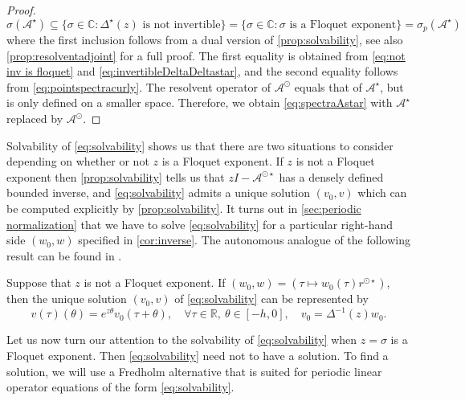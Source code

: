 \documentclass[english]{myarticle}
\begin{document}
\begin{sloppypar}
\begin{proof}
\begin{equation}
    \sigma(\mathcal{A}^{\star}) \subseteq \{ \sigma \in \mathbb{C} : \Delta^\star(z) \mbox{ is not invertible} \} = \{\sigma \in \mathbb{C} : \sigma \mbox{ is a Floquet exponent} \} = \sigma_p(\mathcal{A}^{\star})
\end{equation}
where the first inclusion follows from a dual version of \cref{prop:solvability}, see also \cref{prop:resolventadjoint} for a full proof. The first equality is obtained from \eqref{eq:not inv is floquet} and \eqref{eq:invertibleDeltaDeltastar}, and the second equality follows from \eqref{eq:pointspectracurly}. The resolvent operator of $\mathcal{A}^\odot$ equals that of $\mathcal{A}^\star$, but is only defined on a smaller space. Therefore, we obtain \eqref{eq:spectraAstar} with $\mathcal{A}^\star$ replaced by $\mathcal{A}^\odot$.
\end{proof}

Solvability of \eqref{eq:solvability} shows us that there are two situations to consider depending on whether or not $z$ is a Floquet exponent. If $z$ is not a Floquet exponent then \cref{prop:solvability} tells us that $zI - \mathcal{A}^{\odot \star}$ has a densely defined bounded inverse, and \eqref{eq:solvability} admits a unique solution $(v_0,v)$ which can be computed explicitly by \cref{prop:solvability}. It turns out in \cref{sec:periodic normalization} that we have to solve \eqref{eq:solvability} for a particular right-hand side $(w_0,w)$ specified in \cref{cor:inverse}. The autonomous analogue of the following result can be found in \cite[Corollary 3.4]{Janssens2010}.
\begin{corollary} \label{cor:inverse}
Suppose that $z$ is not a Floquet exponent. If $(w_0,w) = ( \tau \mapsto w_0(\tau)r^{\odot \star})$, then the unique solution $(v_0,v)$ of \eqref{eq:solvability} can be represented by
    \begin{equation*}
    v(\tau)(\theta) = e^{z \theta} v_0(\tau + \theta), \quad \forall \tau \in \mathbb{R}, \ \theta \in [-h,0], \quad v_0 = \Delta^{-1}(z)w_0.
    \end{equation*}
\end{corollary}

Let us now turn our attention to the solvability of \eqref{eq:solvability} when $z = \sigma$ is a Floquet exponent. Then \eqref{eq:solvability} need not to have a solution. To find a solution, we will use a Fredholm alternative that is suited for periodic linear operator equations of the form \eqref{eq:solvability}.


\end{sloppypar}
\end{document}

